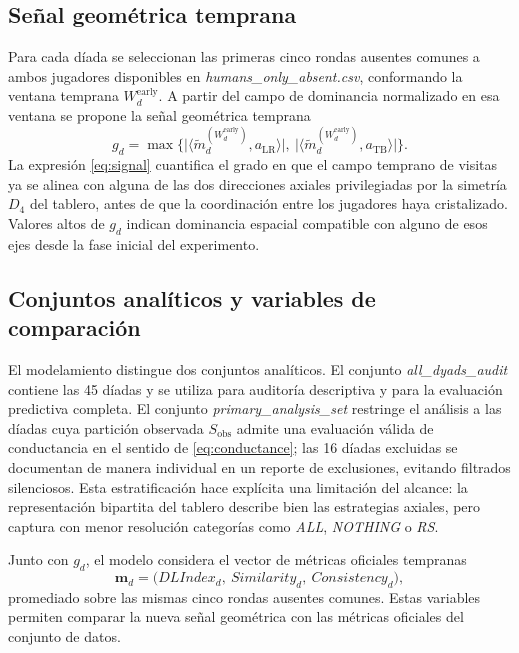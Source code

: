 \documentclass[journal]{IEEEtran}
\newcommand{\Sobs}{S_{\mathrm{obs}}}
\begin{document}
\subsection{Señal geométrica temprana}

Para cada díada se seleccionan las primeras cinco rondas ausentes comunes a ambos jugadores disponibles en \emph{humans\_only\_absent.csv}, conformando la ventana temprana $W_d^{\mathrm{early}}$. A partir del campo de dominancia normalizado en esa ventana se propone la señal geométrica temprana
\begin{equation}
g_d = \max \bigl\{
\bigl|\langle \tilde m_d^{(W_d^{\mathrm{early}})}, a_{\mathrm{LR}} \rangle\bigr|,\
\bigl|\langle \tilde m_d^{(W_d^{\mathrm{early}})}, a_{\mathrm{TB}} \rangle\bigr|
\bigr\}.
\label{eq:signal}
\end{equation}
La expresión \eqref{eq:signal} cuantifica el grado en que el campo temprano de visitas ya se alinea con alguna de las dos direcciones axiales privilegiadas por la simetría $D_4$ del tablero, antes de que la coordinación entre los jugadores haya cristalizado. Valores altos de $g_d$ indican dominancia espacial compatible con alguno de esos ejes desde la fase inicial del experimento.

\subsection{Conjuntos analíticos y variables de comparación}

El modelamiento distingue dos conjuntos analíticos. El conjunto \emph{all\_dyads\_audit} contiene las 45 díadas y se utiliza para auditoría descriptiva y para la evaluación predictiva completa. El conjunto \emph{primary\_analysis\_set} restringe el análisis a las díadas cuya partición observada $\Sobs$ admite una evaluación válida de conductancia en el sentido de \eqref{eq:conductance}; las 16 díadas excluidas se documentan de manera individual en un reporte de exclusiones, evitando filtrados silenciosos. Esta estratificación hace explícita una limitación del alcance: la representación bipartita del tablero describe bien las estrategias axiales, pero captura con menor resolución categorías como \emph{ALL}, \emph{NOTHING} o \emph{RS}.

Junto con $g_d$, el modelo considera el vector de métricas oficiales tempranas
\[
\mathbf{m}_d = \bigl(DLIndex_d,\ Similarity_d,\ Consistency_d\bigr),
\]
promediado sobre las mismas cinco rondas ausentes comunes. Estas variables permiten comparar la nueva señal geométrica con las métricas oficiales del conjunto de datos.
\end{document}
